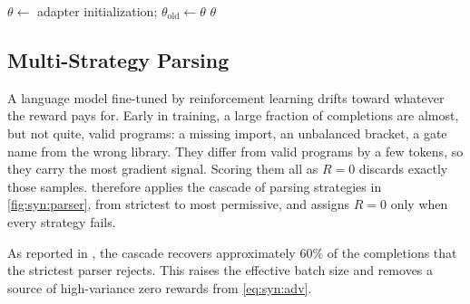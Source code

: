 \begin{algorithm}[htbp]
\caption{\rubriq{} rubric-guided GRPO fine-tuning.}
\label{alg:syn:rubriq}
$\theta\leftarrow$ adapter initialization; $\theta_{\mathrm{old}}\leftarrow\theta$\;
\Return $\theta$\;
\end{algorithm}

\subsection{Multi-Strategy Parsing}\label{sec:syn:parsing}

A language model fine-tuned by reinforcement learning drifts toward whatever the reward pays for. Early in training, a large fraction of completions are almost, but not quite, valid programs: a missing import, an unbalanced bracket, a gate name from the wrong library. They differ from valid programs by a few tokens, so they carry the most gradient signal. Scoring them all as $R=0$ discards exactly those samples. \rubriq{} therefore applies the cascade of parsing strategies in \cref{fig:syn:parser}, from strictest to most permissive, and assigns $R=0$ only when every strategy fails.

As reported in \cite{guo2026rubriq}, the cascade recovers approximately $60\%$ of the completions that the strictest parser rejects. This raises the effective batch size and removes a source of high-variance zero rewards from \cref{eq:syn:adv}.

